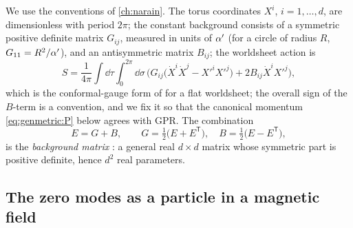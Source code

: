 We use the conventions of \cref{ch:narain}. The torus coordinates $X^i$, $i=1,\dots,d$, are
dimensionless with period $2\pi$; the constant background consists of a symmetric positive
definite matrix $G_{ij}$, measured in units of $\alpha'$ (for a circle of radius $R$,
$G_{11}=R^2/\alpha'$), and an antisymmetric matrix $B_{ij}$; the worldsheet action is
\begin{equation}\label{eq:genmetric:action}
 S=\frac1{4\pi}\int\!\dd\tau\int_0^{2\pi}\!\!\dd\sigma\,
 \Big(G_{ij}\big(\dot X^i\dot X^j-X'^iX'^j\big)+2B_{ij}\dot X^iX'^j\Big),
\end{equation}
which is the conformal-gauge form of  for a
flat worldsheet; the overall sign of the $B$-term is a convention, and we fix it so that the
canonical momentum \eqref{eq:genmetric:P} below agrees with GPR. The combination
\begin{equation}\label{eq:genmetric:E}
 E=G+B,\qquad G=\tfrac12\big(E+E^{\mathsf T}\big),\quad B=\tfrac12\big(E-E^{\mathsf T}\big),
\end{equation}
is the \emph{background matrix} : a general real $d\times d$ matrix whose symmetric part is positive definite,
hence $d^2$ real parameters.

\subsection{The zero modes as a particle in a magnetic field}

